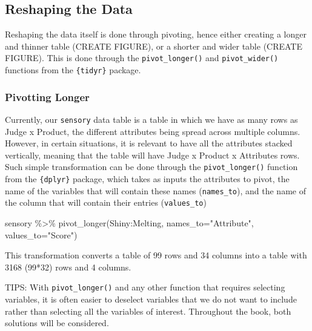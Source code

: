 \documentclass[
]{book}
\newenvironment{Shaded}{\begin{snugshade}}{\end{snugshade}}
\newcommand{\AttributeTok}[1]{\textcolor[rgb]{0.77,0.63,0.00}{#1}}
\newcommand{\FunctionTok}[1]{\textcolor[rgb]{0.00,0.00,0.00}{#1}}
\newcommand{\NormalTok}[1]{#1}
\newcommand{\SpecialCharTok}[1]{\textcolor[rgb]{0.00,0.00,0.00}{#1}}
\newcommand{\StringTok}[1]{\textcolor[rgb]{0.31,0.60,0.02}{#1}}
\begin{document}
\hypertarget{reshaping-the-data}{%
\subsection{Reshaping the Data}\label{reshaping-the-data}}

Reshaping the data itself is done through pivoting, hence either creating a longer and thinner table (CREATE FIGURE), or a shorter and wider table (CREATE FIGURE). This is done through the \texttt{pivot\_longer()} and \texttt{pivot\_wider()} functions from the \texttt{\{tidyr\}} package.

\hypertarget{pivotting-longer}{%
\subsubsection{Pivotting Longer}\label{pivotting-longer}}

Currently, our \texttt{sensory} data table is a table in which we have as many rows as Judge x Product, the different attributes being spread across multiple columns. However, in certain situations, it is relevant to have all the attributes stacked vertically, meaning that the table will have Judge x Product x Attributes rows. Such simple transformation can be done through the \texttt{pivot\_longer()} function from the \texttt{\{dplyr\}} package, which takes as inputs the attributes to pivot, the name of the variables that will contain these names (\texttt{names\_to}), and the name of the column that will contain their entries (\texttt{values\_to})

\begin{Shaded}
\begin{Highlighting}[]
\NormalTok{sensory }\SpecialCharTok{\%\textgreater{}\%} 
  \FunctionTok{pivot\_longer}\NormalTok{(Shiny}\SpecialCharTok{:}\NormalTok{Melting, }\AttributeTok{names\_to=}\StringTok{"Attribute"}\NormalTok{, }\AttributeTok{values\_to=}\StringTok{"Score"}\NormalTok{)}
\end{Highlighting}
\end{Shaded}

This transformation converts a table of 99 rows and 34 columns into a table with 3168 (99*32) rows and 4 columns.

TIPS: With \texttt{pivot\_longer()} and any other function that requires selecting variables, it is often easier to deselect variables that we do not want to include rather than selecting all the variables of interest. Throughout the book, both solutions will be considered.
\end{document}
